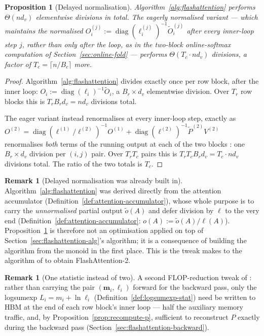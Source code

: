 \documentclass[11pt]{amsart}
\theoremstyle{plain}
\newtheorem{proposition}[theorem]{Proposition}
\theoremstyle{definition}
\newtheorem{remark}[theorem]{Remark}
\newcommand{\diag}{\operatorname{diag}}
\begin{document}
\begin{proposition}[Delayed normalisation]
\label{prop:delayed-normalisation}
Algorithm~\ref{alg:flashattention} performs $\Theta(nd_v)$ elementwise
divisions in total.  The \emph{eagerly normalised} variant --- which
maintains the normalised $O_i^{(j)} := \diag(\boldsymbol{\ell}_i^{(j)})^{-1}
\tilde{O}_i^{(j)}$ after every inner-loop step $j$, rather than only after
the loop, as in the two-block online-softmax computation of
Section~\ref{sec:online-fold} --- performs $\Theta(T_c \cdot n d_v)$
divisions, a factor of $T_c = \lceil n/B_c\rceil$ more.
\end{proposition}
\begin{proof}
Algorithm~\ref{alg:flashattention} divides exactly once per row block, after
the inner loop: $O_i := \diag(\boldsymbol{\ell}_i)^{-1}\tilde{O}_i$, a
$B_r \times d_v$ elementwise division.  Over $T_r$ row blocks this is
$T_r B_r d_v = n d_v$ divisions total.

The eager variant instead renormalises at every inner-loop step, exactly as
$O^{(2)} = \diag(\ell^{(1)}/\ell^{(2)})^{-1}O^{(1)} +
\diag(\ell^{(2)})^{-1}\tilde{P}^{(2)}V^{(2)}$ renormalises \emph{both} terms
of the running output at each of the two blocks \cite{Dao2023}: one
$B_r\times d_v$ division per $(i,j)$ pair.  Over $T_r T_c$ pairs this is
$T_r T_c B_r d_v = T_c \cdot n d_v$ divisions total.  The ratio of the two
totals is $T_c$.
\end{proof}

\begin{remark}[Delayed normalisation was already built in]
Algorithm~\ref{alg:flashattention} was derived directly from the attention
accumulator (Definition~\ref{def:attention-accumulator}), whose whole
purpose is to carry the \emph{unnormalised} partial output $\tilde{o}(A)$
and defer division by $\ell$ to the very end (Definition~\ref{def:attention-accumulator}: $o(A) := \tilde{o}(A)/\ell(A)$).  Proposition~\ref{prop:delayed-normalisation}
is therefore not an optimisation applied on top of
Section~\ref{sec:flashattention-alg}'s algorithm; it is a consequence of
building the algorithm from the monoid in the first place.  This is the
tweak \cite{Dao2023} makes to the algorithm of \cite{Dao2022} to obtain
FlashAttention-2.
\end{remark}

\begin{remark}[One statistic instead of two]
A second FLOP-reduction tweak of \cite{Dao2023}: rather than carrying the
pair $(\mathbf{m}_i,\boldsymbol{\ell}_i)$ forward for the backward pass, only
the logsumexp $L_i = m_i + \ln \ell_i$
(Definition~\ref{def:logsumexp-stat}) need be written to HBM at the end of
each row block's inner loop --- half the auxiliary memory traffic, and,
by Proposition~\ref{prop:recompute-p}, sufficient to reconstruct $P$ exactly
during the backward pass (Section~\ref{sec:flashattention-backward}).
\end{remark}
\end{document}
